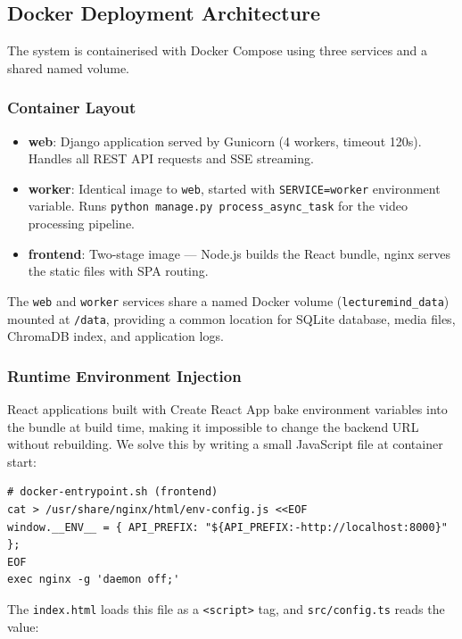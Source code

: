 \subsection{Docker Deployment Architecture}

The system is containerised with Docker Compose using three services and a shared named volume.

\subsubsection{Container Layout}

\begin{itemize}
    \item \textbf{web}: Django application served by Gunicorn (4 workers, timeout 120s). Handles all REST API requests and SSE streaming.
    \item \textbf{worker}: Identical image to \texttt{web}, started with \texttt{SERVICE=worker} environment variable. Runs \texttt{python manage.py process\_async\_task} for the video processing pipeline.
    \item \textbf{frontend}: Two-stage image --- Node.js builds the React bundle, nginx serves the static files with SPA routing.
\end{itemize}

The \texttt{web} and \texttt{worker} services share a named Docker volume (\texttt{lecturemind\_data}) mounted at \texttt{/data}, providing a common location for SQLite database, media files, ChromaDB index, and application logs.

\subsubsection{Runtime Environment Injection}

React applications built with Create React App bake environment variables into the bundle at build time, making it impossible to change the backend URL without rebuilding. We solve this by writing a small JavaScript file at container start:

\begin{lstlisting}[language=text, caption={nginx Entrypoint: Runtime Config Injection}]
# docker-entrypoint.sh (frontend)
cat > /usr/share/nginx/html/env-config.js <<EOF
window.__ENV__ = { API_PREFIX: "${API_PREFIX:-http://localhost:8000}" };
EOF
exec nginx -g 'daemon off;'
\end{lstlisting}

The \texttt{index.html} loads this file as a \texttt{<script>} tag, and \texttt{src/config.ts} reads the value:

